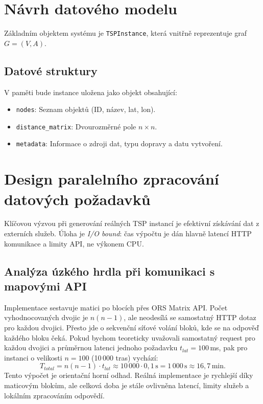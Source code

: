 \section{Návrh datového modelu}
Základním objektem systému je \texttt{TSPInstance}, která vnitřně reprezentuje graf $G=(V, A)$.

\subsection{Datové struktury}
V paměti bude instance uložena jako objekt obsahující:
\begin{itemize}
    \item \texttt{nodes}: Seznam objektů (ID, název, lat, lon).
    \item \texttt{distance\_matrix}: Dvourozměrné pole $n \times n$.
    \item \texttt{metadata}: Informace o zdroji dat, typu dopravy a datu vytvoření.
\end{itemize}

\section{Design paralelního zpracování datových požadavků}
\label{sec:design_paralelizace}

Klíčovou výzvou při generování reálných TSP instancí je efektivní získávání dat z externích služeb. Úloha je \textit{I/O bound}: čas výpočtu je dán hlavně latencí HTTP komunikace a limity API, ne výkonem CPU.

\subsection{Analýza úzkého hrdla při komunikaci s mapovými API}
Implementace sestavuje matici po blocích přes ORS Matrix API. Počet vyhodnocovaných dvojic je $n(n-1)$, ale neodesílá se samostatný HTTP dotaz pro každou dvojici. Přesto jde o sekvenční síťové volání bloků, kde se na odpověď každého bloku čeká.
Pokud bychom teoreticky uvažovali samostatný request pro každou dvojici a průměrnou latenci jednoho požadavku $t_{lat} = 100$\,ms, pak pro instanci o velikosti $n=100$ (10\,000 tras) vychází:
\begin{equation}
T_{total} = n(n-1) \cdot t_{lat} \approx 10\,000 \cdot 0,1\,\text{s} = 1\,000\,\text{s} \approx 16,7\,\text{min}.
\end{equation}
Tento výpočet je orientační horní odhad. Reálná implementace je rychlejší díky maticovým blokům, ale celková doba je stále ovlivněna latencí, limity služeb a lokálním zpracováním odpovědí.


